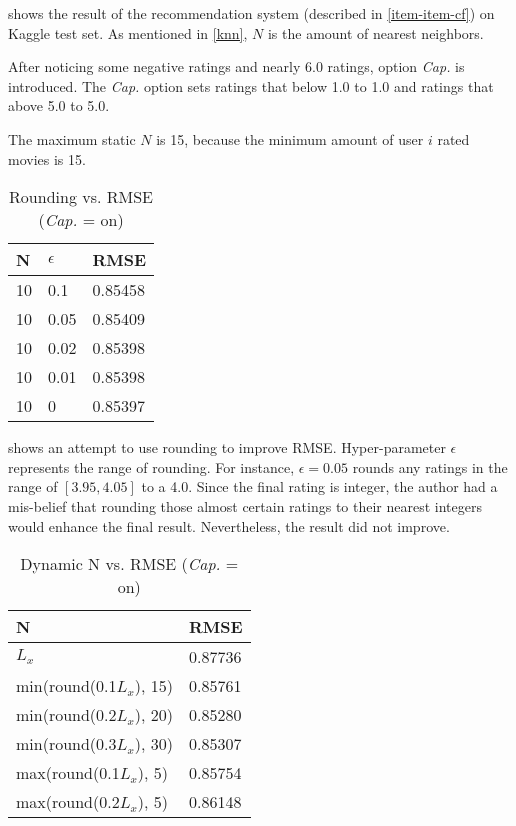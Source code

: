 \documentclass{ece}
\begin{document}
 shows the result of the recommendation system (described in \ref{item-item-cf}) on Kaggle test set.
As mentioned in \ref{knn}, $N$ is the amount of nearest neighbors.

After noticing some negative ratings and nearly 6.0 ratings, option \textit{Cap.} is introduced.
The \textit{Cap.} option sets ratings that below 1.0 to 1.0 and ratings that above 5.0 to 5.0.

The maximum static $N$ is 15, because the minimum amount of user $i$ rated movies is 15.

\begin{table}[h]
    \caption[Rounding vs. RMSE]{Rounding vs. RMSE (\textit{Cap.} = on)}
    \label{tab:table-3}
    \centering
\begin{tabular}{|l|l|l|}
\hline
N  & $\epsilon$ & RMSE    \\ \hline
10 & 0.1     & 0.85458 \\ \hline
10 & 0.05    & 0.85409 \\ \hline
10 & 0.02    & 0.85398 \\ \hline
10 & 0.01    & 0.85398 \\ \hline
10 & 0       & 0.85397 \\ \hline
\end{tabular}
\end{table}

 shows an attempt to use rounding to improve RMSE. 
Hyper-parameter $\epsilon$ represents the range of rounding. For instance, $\epsilon=0.05$ rounds any ratings in the range of $[3.95, 4.05]$ to a 4.0.
Since the final rating is integer, the author had a mis-belief that rounding those almost certain ratings to their nearest integers would enhance the final result.
Nevertheless, the result did not improve.

\begin{table}[h]
    \caption[Dynamic N vs. RMSE]{Dynamic N vs. RMSE (\textit{Cap.} = on)}
    \label{tab:table-4}
    \centering
\begin{tabular}{|l|l|}
\hline
N            & RMSE    \\ \hline
$L_x$                    & 0.87736 \\ \hline
min(round(0.1$L_x$), 15) & 0.85761 \\ \hline
min(round(0.2$L_x$), 20) & 0.85280 \\ \hline
min(round(0.3$L_x$), 30) & 0.85307 \\ \hline
max(round(0.1$L_x$), 5)  & 0.85754 \\ \hline
max(round(0.2$L_x$), 5)  & 0.86148 \\ \hline
\end{tabular}
\end{table}
\end{document}
